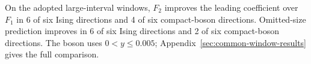 On the adopted large-interval windows, $F_2$ improves the leading coefficient over $F_1$ in 6 of six Ising directions and 4 of six compact-boson directions. Omitted-size prediction improves in 6 of six Ising directions and 2 of six compact-boson directions. The boson uses $0<y\leq0.005$; Appendix~\ref{sec:common-window-results} gives the full comparison.
